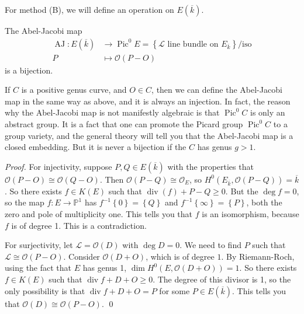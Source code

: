 For method (B), we will define an operation on \( E( \overline{k} ) \).
\begin{proposition}
  The Abel-Jacobi map
  \begin{align*}
    \operatorname{AJ} \colon E( \overline{k}) & \to \operatorname{Pic}^0 E = \left\lbrace \mathcal{L} \text{ line bundle on } E_{\overline{k}} \right\rbrace / \text{iso} \\
    P & \mapsto \mathcal{O} \left( P-O \right)
 \end{align*}
  is a bijection.
\end{proposition}
\begin{remark}
  If \( C \) is a positive genus curve, and \( O \in C \), then we can define the Abel-Jacobi map in the same way as above, and it is always an injection.
  In fact, the reason why the Abel-Jacobi map is not manifestly algebraic is that \( \operatorname{Pic}^0 C \) is only an abstract group.
  It is a fact that one can promote the Picard group \( \operatorname{Pic}^0 C \) to a group variety, and the general theory will tell you that the Abel-Jacobi map is a closed embedding.
  But it is never a bijection if the \( C \) has genus \( g>1 \).
\end{remark}
\textit{Proof.} For injectivity, suppose \( P , Q \in E( \overline{k} ) \) with the properties that \( \mathcal{O} \left( P - O \right) \cong \mathcal{O} \left( Q - O \right) \). Then \( \mathcal{O} \left( P - Q \right) \cong \mathcal{O}_E \), so \( H^0 \left( E_{\overline{k}},\mathcal{O} \left( P - Q \right) \right) = \overline{k} \).
So there exists \( f \in K(E) \) such that \( \operatorname{div} (f) + P - Q \geq 0 \).
But the \( \operatorname{deg} f = 0 \), so the map \( f \colon E \to \mathbb{P}^1 \) has \( f^{-1} \left\lbrace 0 \right\rbrace = \left\lbrace Q \right\rbrace \) and \( f^{-1} \left\lbrace \infty \right\rbrace = \left\lbrace P \right\rbrace \), both the zero and pole of multiplicity one.
This tells you that \( f \) is an isomorphism, because \( f \) is of degree 1. This is a contradiction.

For surjectivity, let \( \mathcal{L} = \mathcal{O}(D) \) with \( \operatorname{deg} D = 0 \).
We need to find \( P \) such that \( \mathcal{L} \cong \mathcal{O} \left( P-O \right) \).
Consider \( \mathcal{O} \left( D + O \right) \), which is of degree \( 1 \).
By Riemann-Roch, using the fact that \( E \) has genus 1,
\( \operatorname{dim}H^0 \left( E,\mathcal{O}(D+O) \right) = 1 \).
So there exists \( f \in K(E) \) such that \( \operatorname{div} f + D + O \geq 0 \).
The degree of this divisor is 1, so the only possibility is that \( \operatorname{div} f + D + O = P \) for some \( P \in E( \overline{k} ) \).
This tells you that \( \mathcal{O}(D) \cong \mathcal{O}(P-O) \).
\qed

